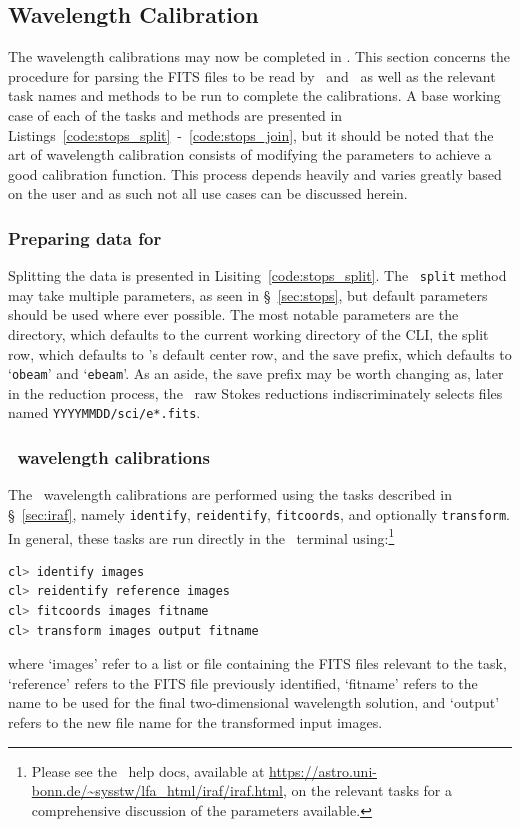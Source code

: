\subsection{Wavelength Calibration} \label{subsec:reduc_wav}

The wavelength calibrations may now be completed in \iraf. This section concerns the procedure for parsing the \gls{FITS} files to be read by \iraf\ and \polsalt\ as well as the relevant task names and methods to be run to complete the calibrations. A base working case of each of the tasks and methods are presented in Listings~\ref{code:stops_split}~-~\ref{code:stops_join}, but it should be noted that the art of wavelength calibration consists of modifying the parameters to achieve a good calibration function. This process depends heavily and varies greatly based on the user and as such not all use cases can be discussed herein.

\subsubsection{Preparing data for \iraf}

Splitting the data is presented in Lisiting~\ref{code:stops_split}. The \stops\ \texttt{split} method may take multiple parameters, as seen in \S~\ref{sec:stops}, but default parameters should be used where ever possible. The most notable parameters are the directory, which defaults to the current working directory of the \gls{CLI}, the split row, which defaults to \polsalt's default center row, and the save prefix, which defaults to `\texttt{obeam}' and `\texttt{ebeam}'. As an aside, the save prefix may be worth changing as, later in the reduction process, the \polsalt\ raw Stokes reductions indiscriminately selects files named \texttt{YYYYMMDD/sci/e*.fits}.

\subsubsection{\iraf\ wavelength calibrations}

The \iraf\ wavelength calibrations are performed using the tasks described in \S~\ref{sec:iraf}, namely \texttt{identify}, \texttt{reidentify}, \texttt{fitcoords}, and optionally \texttt{transform}. In general, these tasks are run directly in the \iraf\ terminal using:\footnote{Please see the \iraf\ help docs, available at \url{https://astro.uni-bonn.de/~sysstw/lfa_html/iraf/iraf.html}, on the relevant tasks for a comprehensive discussion of the parameters available.}
\begin{lstlisting}[language=bash]
cl> identify images
cl> reidentify reference images
cl> fitcoords images fitname
cl> transform images output fitname
\end{lstlisting}
{\parskip=0pt
where `images' refer to a list or file containing the \gls{FITS} files relevant to the task, `reference' refers to the \gls{FITS} file previously identified, `fitname' refers to the name to be used for the final two-dimensional wavelength solution, and `output' refers to the new file name for the transformed input images.
}


